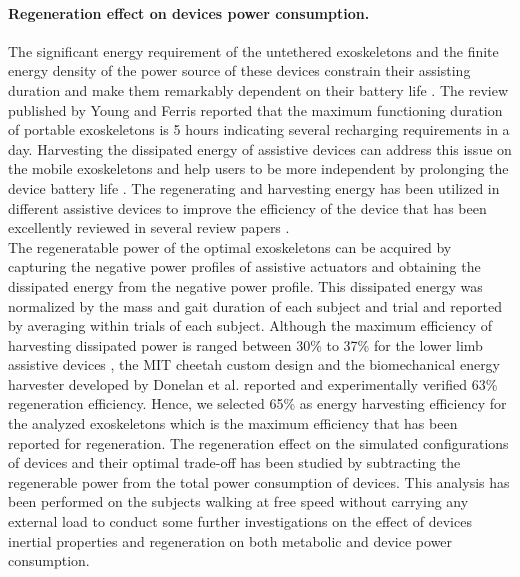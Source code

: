 \documentclass[10pt,letterpaper]{article}
\begin{document}
\paragraph*{Regeneration effect on devices power consumption.} The significant energy requirement of the untethered exoskeletons and the finite energy density of the power source of these devices constrain their assisting duration and make them remarkably dependent on their battery life \cite{140}. The review published by Young and Ferris \cite {36} reported that the maximum functioning duration of portable exoskeletons is 5 hours indicating several recharging requirements in a day. Harvesting the dissipated energy of assistive devices can address this issue on the mobile exoskeletons and help users to be more independent by prolonging the device battery life \cite{140,141,142}. The regenerating and harvesting energy has been utilized in different assistive devices to improve the efficiency of the device that has been excellently reviewed in several review papers \cite{140,141,142}.\\
The regeneratable power of the optimal exoskeletons can be acquired by capturing the negative power profiles of assistive actuators and obtaining the dissipated energy from the negative power profile. This dissipated energy was normalized by the mass and gait duration of each subject and trial and reported by averaging within trials of each subject. Although the maximum efficiency of harvesting dissipated power is ranged between 30\% to 37\% for the lower limb assistive devices \cite{140}, the MIT cheetah custom design \cite{144,145} and the biomechanical energy harvester developed by Donelan et al. \cite{143} reported and experimentally verified 63\% regeneration efficiency. Hence, we selected 65\% as energy harvesting efficiency for the analyzed exoskeletons which is the maximum efficiency that has been reported for regeneration. The regeneration effect on the simulated configurations of devices and their optimal trade-off has been studied by subtracting the regenerable power from the total power consumption of devices. This analysis has been performed on the subjects walking at free speed without carrying any external load to conduct some further investigations on the effect of devices inertial properties and regeneration on both metabolic and device power consumption.\\
\end{document}
